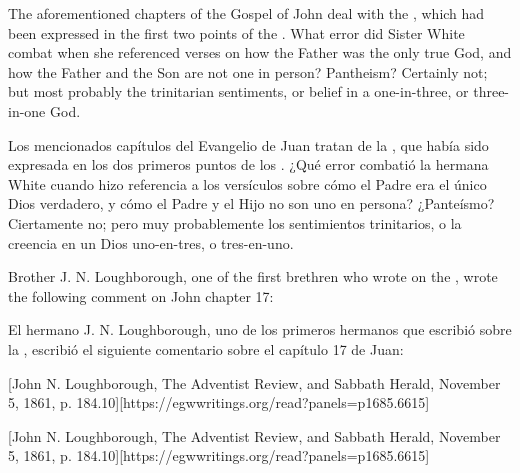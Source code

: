 The aforementioned chapters of the Gospel of John deal with the , which had been expressed in the first two points of the . What error did Sister White combat when she referenced verses on how the Father was the only true God, and how the Father and the Son are not one in person? Pantheism? Certainly not; but most probably the trinitarian sentiments, or belief in a one-in-three, or three-in-one God.


Los mencionados capítulos del Evangelio de Juan tratan de la , que había sido expresada en los dos primeros puntos de los . ¿Qué error combatió la hermana White cuando hizo referencia a los versículos sobre cómo el Padre era el único Dios verdadero, y cómo el Padre y el Hijo no son uno en persona? ¿Panteísmo? Ciertamente no; pero muy probablemente los sentimientos trinitarios, o la creencia en un Dios uno-en-tres, o tres-en-uno.


Brother J. N. Loughborough, one of the first brethren who wrote on the , wrote the following comment on John chapter 17:


El hermano J. N. Loughborough, uno de los primeros hermanos que escribió sobre la , escribió el siguiente comentario sobre el capítulo 17 de Juan:


[John N. Loughborough, The Adventist Review, and Sabbath Herald, November 5, 1861, p. 184.10][https://egwwritings.org/read?panels=p1685.6615]


[John N. Loughborough, The Adventist Review, and Sabbath Herald, November 5, 1861, p. 184.10][https://egwwritings.org/read?panels=p1685.6615]


